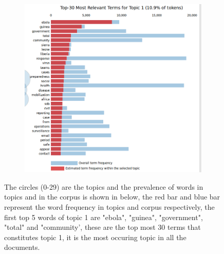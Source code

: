 \begin{figure}[h!]
\begin{subfigure}[h]{0.60\textwidth}
        \includegraphics[width=\textwidth]{c4_8.png}
        \label{fig:trapez2}
    \end{subfigure}
    \caption{The circles (0-29) are the topics and the prevalence of words in topics and in the corpus is shown in below, the red bar and blue bar represent the word frequency in topics and corpus respectively, the first top 5 words of topic 1 are "ebola", "guinea", "government", "total"  and "community', these are the top most 30 terms that constitutes topic 1, it is the most occuring topic in all the documents.}\label{figure 4.6}
\end{figure}
%


